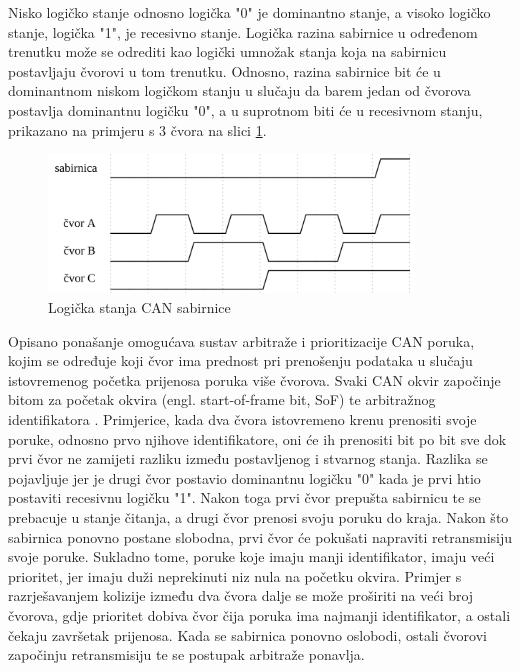 \documentclass[times, utf8, diplomski, numeric]{fer}
\begin{document}
Nisko logičko stanje odnosno logička "0" je dominantno stanje, a visoko logičko stanje, logička "1", je recesivno stanje. Logička razina sabirnice u određenom trenutku može se odrediti kao logički umnožak stanja koja na sabirnicu postavljaju čvorovi u tom trenutku. Odnosno, razina sabirnice bit će u dominantnom niskom logičkom stanju u slučaju da barem jedan od čvorova postavlja dominantnu logičku "0", a u suprotnom biti će u recesivnom stanju, prikazano na primjeru s 3 čvora na slici \ref{fig:sabirnica}. 
\newpage
\begin{figure}[htb]
\centering
\includegraphics[width=275pt]{slike/sabirnica.png}
\caption{Logička stanja CAN sabirnice}
\label{fig:sabirnica}
\end{figure}

Opisano ponašanje omogućava sustav arbitraže i prioritizacije CAN poruka, kojim se određuje koji čvor ima prednost pri prenošenju podataka u slučaju istovremenog početka prijenosa poruka više čvorova. Svaki CAN okvir započinje bitom za početak okvira (engl. start-of-frame bit, SoF) te arbitražnog identifikatora . Primjerice, kada dva čvora istovremeno krenu prenositi svoje poruke, odnosno prvo njihove identifikatore, oni će ih prenositi bit po bit sve dok prvi čvor ne zamijeti razliku između postavljenog i stvarnog stanja. Razlika se pojavljuje jer je drugi čvor postavio dominantnu logičku "0" kada je prvi htio postaviti recesivnu logičku "1". Nakon toga prvi čvor prepušta sabirnicu te se prebacuje u stanje čitanja, a drugi čvor prenosi svoju poruku do kraja. Nakon što sabirnica ponovno postane slobodna, prvi čvor će pokušati napraviti retransmisiju svoje poruke. Sukladno tome, poruke koje imaju manji identifikator, imaju veći prioritet, jer imaju duži neprekinuti niz nula na početku okvira. Primjer s razrješavanjem kolizije između dva čvora dalje se može proširiti na veći broj čvorova, gdje prioritet dobiva čvor čija poruka ima najmanji identifikator, a ostali čekaju završetak prijenosa. Kada se sabirnica ponovno oslobodi, ostali čvorovi započinju retransmisiju te se postupak arbitraže ponavlja.
\end{document}
